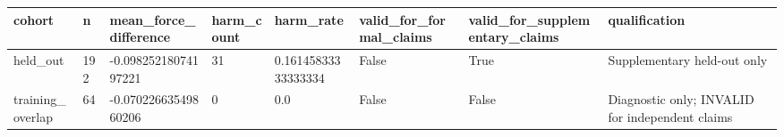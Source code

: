 \begin{tabular}{llllllll}
\toprule
cohort & n & mean\_force\_difference & harm\_count & harm\_rate & valid\_for\_formal\_claims & valid\_for\_supplementary\_claims & qualification \\
\midrule
held\_out & 192 & -0.09825218074197221 & 31 & 0.16145833333333334 & False & True & Supplementary held-out only \\
training\_overlap & 64 & -0.07022663549860206 & 0 & 0.0 & False & False & Diagnostic only; INVALID for independent claims \\
\bottomrule
\end{tabular}
